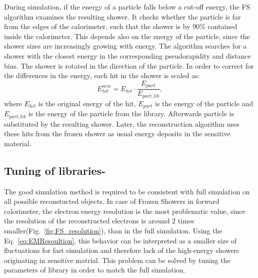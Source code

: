 During simulation, if the energy of a particle falls below a cut-off energy, the FS algorithm examines the resulting shower. It checks whether the particle is far from the edges of the calorimeter, such that the  shower is by 90\% contained inside the calorimeter. This depends also on the energy of the particle, since the  shower sizes are increasingly growing with energy. The algorithm searches for a shower with the closest energy in the corresponding pseudorapidity and distance bins. The shower is rotated in the direction of the particle. In order to correct for the differences in the energy, each hit in the shower is scaled as:
\begin{equation}
E_{hit}^{new}=E_{hit}\cdot \frac{E_{part}}{E_{part,lib}},
\end{equation}
where $E_{hit}$ is the original energy of the hit, $E_{part}$ is the energy of the particle and $E_{part,lib}$ is the energy of the particle from the library. Afterwards particle is substituted by the resulting shower. Later, the reconstruction algorithm uses these hits from the frozen shower as usual energy deposits in the sensitive material. 

\begin{figure}[!tbp]
\end{figure}

\begin{figure}[!tbp]
\end{figure}

\subsection{Tuning of libraries-}\label{sec:LibTuning}

The good simulation method is required to be consistent with full simulation on all possible reconstucted objects. In case of Frozen Showers in forward calorimeter, the electron energy resolution is the most problematic value, since the resolution of the reconstructed electrons is around 2 times smaller(Fig.~\ref{fig:FS_resolution}), than in the full simulation. Using the Eq.~\ref{eq:EMResoultion}, this behavior can be interpreted as a smaller size of fluctuations for fast simulation and therefore lack of the high-energy showers originating in sensitive matrial. This problem can be solved by tuning the parameters of library in order to match the full simulation.

